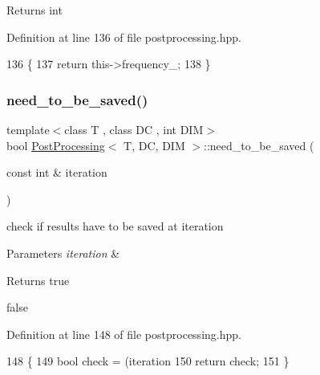 \begin{DoxyReturn}{Returns}
int 
\end{DoxyReturn}


Definition at line 136 of file postprocessing.\+hpp.


\begin{DoxyCode}
136                                               \{
137   \textcolor{keywordflow}{return} this->frequency\_;
138 \}
\end{DoxyCode}
\mbox{\label{classPostProcessing_ad8a8e567536f9ac9a891d86abe202efe}} 
\subsubsection{\texorpdfstring{need\+\_\+to\+\_\+be\+\_\+saved()}{need\_to\_be\_saved()}}
{\footnotesize\ttfamily template$<$class T , class DC , int D\+IM$>$ \\
bool \hyperlink{classPostProcessing}{Post\+Processing}$<$ T, DC, D\+IM $>$\+::need\+\_\+to\+\_\+be\+\_\+saved (\begin{DoxyParamCaption}\item[{const int \&}]{iteration }\end{DoxyParamCaption})}



check if results have to be saved at iteration 


\begin{DoxyParams}{Parameters}
{\em iteration} & \\
\hline
\end{DoxyParams}
\begin{DoxyReturn}{Returns}
true 

false 
\end{DoxyReturn}


Definition at line 148 of file postprocessing.\+hpp.


\begin{DoxyCode}
148                                                                       \{
149   \textcolor{keywordtype}{bool} check = (iteration %
150   \textcolor{keywordflow}{return} check;
151 \}
\end{DoxyCode}
\mbox{\label{classPostProcessing_a5872fc7f3527be648339ec33e9536578}} 
